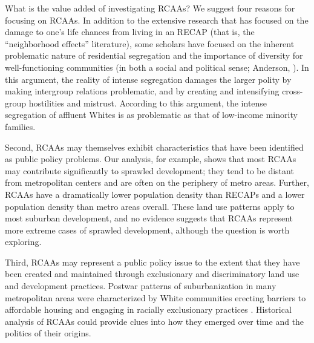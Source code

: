 \documentclass[11pt,]{article}
\begin{document}
What is the value added of investigating RCAAs? We suggest four reasons
for focusing on RCAAs. In addition to the extensive research that has
focused on the damage to one's life chances from living in an RECAP
(that is, the ``neighborhood effects'' literature), some scholars have
focused on the inherent problematic nature of residential segregation
and the importance of diversity for well-functioning communities (in
both a social and political sense; Anderson, \autocite*{anderson2010}).
In this argument, the reality of intense segregation damages the larger
polity by making intergroup relations problematic, and by creating and
intensifying cross-group hostilities and mistrust. According to this
argument, the intense segregation of affluent Whites is as problematic
as that of low-income minority families.

Second, RCAAs may themselves exhibit characteristics that have been
identified as public policy problems. Our analysis, for example, shows
that most RCAAs may contribute significantly to sprawled development;
they tend to be distant from metropolitan centers and are often on the
periphery of metro areas. Further, RCAAs have a dramatically lower
population density than RECAPs and a lower population density than metro
areas overall. These land use patterns apply to most suburban
development, and no evidence suggests that RCAAs represent more extreme
cases of sprawled development, although the question is worth exploring.

Third, RCAAs may represent a public policy issue to the extent that they
have been created and maintained through exclusionary and discriminatory
land use and development practices. Postwar patterns of suburbanization
in many metropolitan areas were characterized by White communities
erecting barriers to affordable housing and engaging in racially
exclusionary practices \autocite{danielson1976}. Historical analysis of
RCAAs could provide clues into how they emerged over time and the
politics of their origins.
\end{document}
